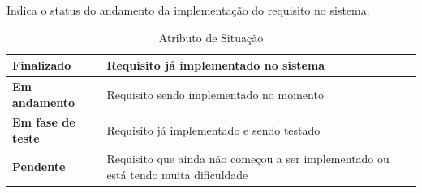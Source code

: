  Indica o status do andamento da implementação do requisito no sistema.

  \begin{table}[!htb]
    \centering
    \begin{tabular}{p{5cm}p{10cm}}
      \toprule
      \textbf{Finalizado}       & Requisito já implementado no sistema                                                \\ \midrule
      \textbf{Em andamento}     & Requisito sendo implementado no momento                                             \\ \midrule
      \textbf{Em fase de teste} & Requisito já implementado e sendo testado                                           \\ \midrule
      \textbf{Pendente}         & Requisito que ainda não começou a ser implementado ou está tendo muita dificuldade  \\
      \bottomrule
    \end{tabular}
    \caption{Atributo de Situação}
  \end{table}

